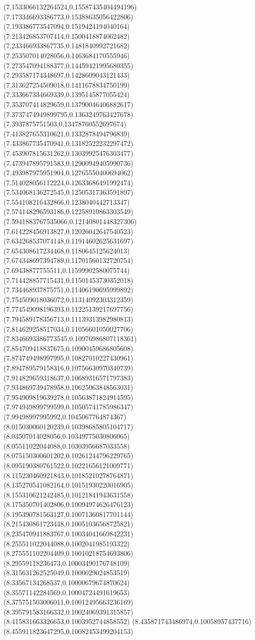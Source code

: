 {(7.1533066132264524,0.15587435404494196)
(7.173346693386773,0.15388635056422806)
(7.193386773547094,0.1519424194040164)
(7.213426853707414,0.1500418874062482)
(7.233466933867735,0.1481840992721682)
(7.253507014028056,0.1463684170555946)
(7.273547094188377,0.14459421995680355)
(7.293587174348697,0.1428609043121433)
(7.313627254509018,0.1411678834750199)
(7.333667334669339,0.1395145877055424)
(7.353707414829659,0.13790046406882617)
(7.3737474949899795,0.1363249763427678)
(7.3937875751503,0.13478760552697674)
(7.413827655310621,0.1332878494796839)
(7.433867735470941,0.13182522232297472)
(7.453907815631262,0.13039925476303477)
(7.473947895791583,0.12900949405990736)
(7.493987975951904,0.12765550400694062)
(7.514028056112224,0.12633686491992474)
(7.534068136272545,0.12505317363591897)
(7.554108216432866,0.1238040442713347)
(7.574148296593186,0.12258910863303549)
(7.5941883767535066,0.12140801448327306)
(7.614228456913827,0.12026042647540523)
(7.634268537074148,0.11914602625631697)
(7.654308617234468,0.1180645125624013)
(7.674348697394789,0.11701560132720754)
(7.69438877755511,0.11599902580075744)
(7.714428857715431,0.11501453730352018)
(7.734468937875751,0.11406190695999892)
(7.754509018036072,0.11314092303312359)
(7.774549098196393,0.11225139217697756)
(7.794589178356713,0.11139313982980813)
(7.814629258517034,0.11056601050027706)
(7.8346693386773545,0.10976986807118361)
(7.854709418837675,0.10900459686805608)
(7.874749498997995,0.10827010227430961)
(7.894789579158316,0.10756630970340739)
(7.914829659318637,0.10689316571797383)
(7.934869739478958,0.10625063848563031)
(7.954909819639278,0.10563871824914595)
(7.974949899799599,0.10505741785986347)
(7.99498997995992,0.1045067764874367)
(8.015030060120239,0.10398685805104717)
(8.03507014028056,0.10349775030806065)
(8.05511022044088,0.10303956687033558)
(8.075150300601202,0.10261244796229765)
(8.095190380761522,0.10221656121009771)
(8.115230460921843,0.10185210278764871)
(8.135270541082164,0.10151930220016905)
(8.155310621242485,0.10121841943631558)
(8.175350701402806,0.10094974626476123)
(8.195390781563127,0.10071360817701144)
(8.215430861723448,0.10051036568725821)
(8.235470941883767,0.10034041669842231)
(8.255511022044088,0.1002041985193322)
(8.275551102204409,0.10010218754693806)
(8.29559118236473,0.10003490176748109)
(8.315631262525049,0.1000029024853519)
(8.33567134268537,0.10000679674870624)
(8.35571142284569,0.10004724491619653)
(8.375751503006011,0.10012495663236169)
(8.395791583166332,0.10024069391315857)
(8.415831663326653,0.1003952744858552)
(8.435871743486974,0.10058957437716)
(8.455911823647295,0.10082453499204153)
}

